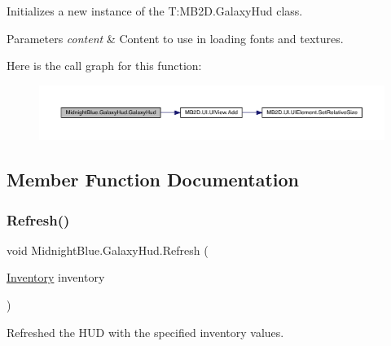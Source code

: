 Initializes a new instance of the T\+:\+M\+B2\+D.\+Galaxy\+Hud class. 


\begin{DoxyParams}{Parameters}
{\em content} & Content to use in loading fonts and textures.\\
\hline
\end{DoxyParams}
Here is the call graph for this function\+:
\nopagebreak
\begin{figure}[H]
\begin{center}
\leavevmode
\includegraphics[width=350pt]{class_midnight_blue_1_1_galaxy_hud_a6f15257e5bc5bbc67cac3888f075ea29_cgraph}
\end{center}
\end{figure}


\subsection{Member Function Documentation}
\hypertarget{class_midnight_blue_1_1_galaxy_hud_aea2d04b212188a2e729ea327b7da0449}{}\label{class_midnight_blue_1_1_galaxy_hud_aea2d04b212188a2e729ea327b7da0449} 
\subsubsection{\texorpdfstring{Refresh()}{Refresh()}}
{\footnotesize\ttfamily void Midnight\+Blue.\+Galaxy\+Hud.\+Refresh (\begin{DoxyParamCaption}\item[{\hyperlink{class_m_b2_d_1_1_entity_component_1_1_inventory}{Inventory}}]{inventory }\end{DoxyParamCaption})\hspace{0.3cm}{\ttfamily [inline]}}



Refreshed the H\+UD with the specified inventory values. 


